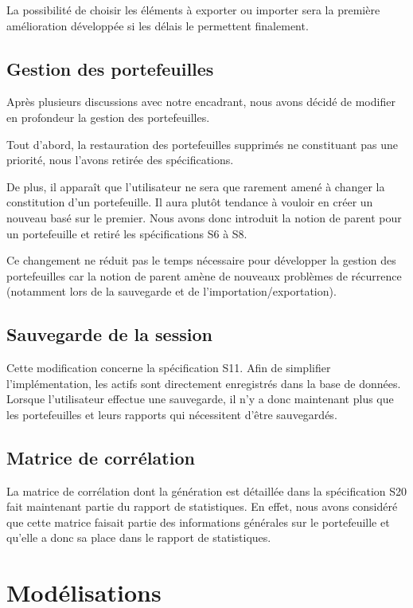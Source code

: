 \documentclass[a4paper,titlepage,french]{report}
\begin{document}
La possibilité de choisir les éléments à exporter ou importer sera la première amélioration développée si les délais le permettent finalement.


\subsection{Gestion des portefeuilles}

Après plusieurs discussions avec notre encadrant, nous avons décidé de modifier en profondeur la gestion des portefeuilles.

Tout d'abord, la restauration des portefeuilles supprimés ne constituant pas une priorité, nous l'avons retirée des spécifications.

De plus, il apparaît que l'utilisateur ne sera que rarement amené à changer la constitution d'un portefeuille.
Il aura plutôt tendance à vouloir en créer un nouveau basé sur le premier.
Nous avons donc introduit la notion de parent pour un portefeuille et retiré les spécifications S6 à S8.

Ce changement ne réduit pas le temps nécessaire pour développer la gestion des portefeuilles car la notion de parent amène de nouveaux problèmes de récurrence (notamment lors de la sauvegarde et de l'importation/exportation).


\subsection{Sauvegarde de la session}

Cette modification concerne la spécification S11.
Afin de simplifier l'implémentation, les actifs sont directement enregistrés dans la base de données.
Lorsque l'utilisateur effectue une sauvegarde, il n'y a donc maintenant plus que les portefeuilles et leurs rapports qui nécessitent d'être sauvegardés.


\subsection{Matrice de corrélation}

La matrice de corrélation dont la génération est détaillée dans la spécification S20 fait maintenant partie du rapport de statistiques.
En effet, nous avons considéré que cette matrice faisait partie des informations générales sur le portefeuille et qu'elle a donc sa place dans le rapport de statistiques.


\section{Modélisations}
\end{document}
